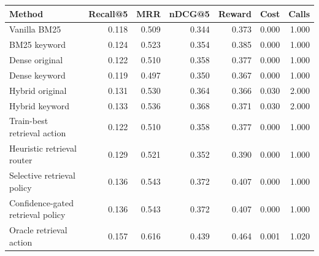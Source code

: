 \begin{tabular}{lrrrrrr}
\toprule
Method & Recall@5 & MRR & nDCG@5 & Reward & Cost & Calls \\
\midrule
Vanilla BM25 & 0.118 & 0.509 & 0.344 & 0.373 & 0.000 & 1.000 \\
BM25 keyword & 0.124 & 0.523 & 0.354 & 0.385 & 0.000 & 1.000 \\
Dense original & 0.122 & 0.510 & 0.358 & 0.377 & 0.000 & 1.000 \\
Dense keyword & 0.119 & 0.497 & 0.350 & 0.367 & 0.000 & 1.000 \\
Hybrid original & 0.131 & 0.530 & 0.364 & 0.366 & 0.030 & 2.000 \\
Hybrid keyword & 0.133 & 0.536 & 0.368 & 0.371 & 0.030 & 2.000 \\
Train-best retrieval action & 0.122 & 0.510 & 0.358 & 0.377 & 0.000 & 1.000 \\
Heuristic retrieval router & 0.129 & 0.521 & 0.352 & 0.390 & 0.000 & 1.000 \\
Selective retrieval policy & 0.136 & 0.543 & 0.372 & 0.407 & 0.000 & 1.000 \\
Confidence-gated retrieval policy & 0.136 & 0.543 & 0.372 & 0.407 & 0.000 & 1.000 \\
Oracle retrieval action & 0.157 & 0.616 & 0.439 & 0.464 & 0.001 & 1.020 \\
\bottomrule
\end{tabular}
